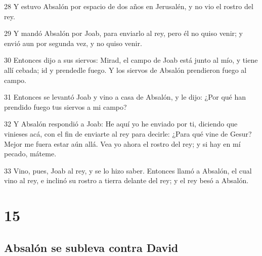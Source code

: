 \par 28 Y estuvo Absalón por espacio de dos años en Jerusalén, y no vio el rostro del rey.
\par 29 Y mandó Absalón por Joab, para enviarlo al rey, pero él no quiso venir; y envió aun por segunda vez, y no quiso venir.
\par 30 Entonces dijo a sus siervos: Mirad, el campo de Joab está junto al mío, y tiene allí cebada; id y prendedle fuego. Y los siervos de Absalón prendieron fuego al campo.
\par 31 Entonces se levantó Joab y vino a casa de Absalón, y le dijo: ¿Por qué han prendido fuego tus siervos a mi campo?
\par 32 Y Absalón respondió a Joab: He aquí yo he enviado por ti, diciendo que vinieses acá, con el fin de enviarte al rey para decirle: ¿Para qué vine de Gesur? Mejor me fuera estar aún allá. Vea yo ahora el rostro del rey; y si hay en mí pecado, máteme.
\par 33 Vino, pues, Joab al rey, y se lo hizo saber. Entonces llamó a Absalón, el cual vino al rey, e inclinó su rostro a tierra delante del rey; y el rey besó a Absalón.

\chapter{15}

\section*{Absalón se subleva contra David}

